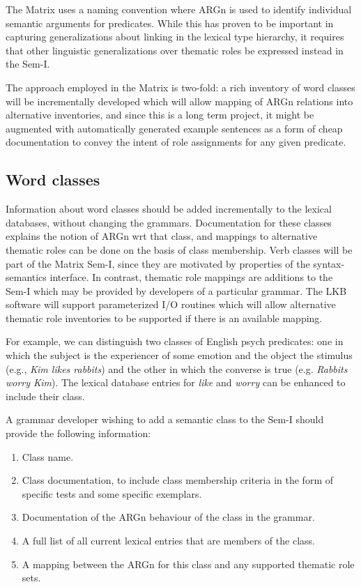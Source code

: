 \documentclass[12pt]{article}
\begin{document}
The Matrix uses a naming convention where ARGn is used to identify
individual semantic arguments for predicates.  While this has proven to be
important in capturing generalizations about linking in the lexical type
hierarchy, it requires that other linguistic generalizations over thematic
roles be expressed instead in the Sem-I.

The approach employed in the Matrix is two-fold: a rich inventory
of word classes will be incrementally developed which will allow mapping
of ARGn relations into alternative inventories, and since this is
a long term project, it might be augmented with automatically
generated example sentences as a form of cheap documentation to convey the
intent of role assignments for any given predicate.

\subsection{Word classes}

Information about word classes should be added
incrementally to the lexical databases, without changing the grammars.
Documentation for these classes explains the notion of ARGn wrt that class, and
mappings to alternative thematic roles can be done on the basis of class 
membership.
Verb classes will be part of the Matrix Sem-I, since they are motivated by 
properties of the syntax-semantics interface.  In contrast, thematic role 
mappings are additions to the Sem-I which may be provided by developers of
a particular grammar.  The LKB software will support parameterized I/O routines
which will allow alternative thematic
role inventories to be supported if there is an available mapping.

For example, we can distinguish two classes of
English psych predicates: one in which the subject is
the experiencer of some emotion and the object the stimulus
(e.g., {\it Kim likes rabbits}) and the other in which the converse is true
(e.g. {\it Rabbits worry Kim}).  The lexical database entries
for {\it like} and {\it worry} can be enhanced to include their class.

A grammar developer wishing to add a semantic class to the Sem-I
should provide the following information:
\begin{enumerate}
\item Class name.
\item Class documentation, to include 
class membership criteria in the form of specific tests
and some specific exemplars.
\item Documentation of the ARGn behaviour of the class in the grammar.
\item A full list of all current lexical entries that are members
of the class.
\item A mapping between the ARGn for this class and any supported
thematic role sets.
\end{enumerate}
\end{document}
